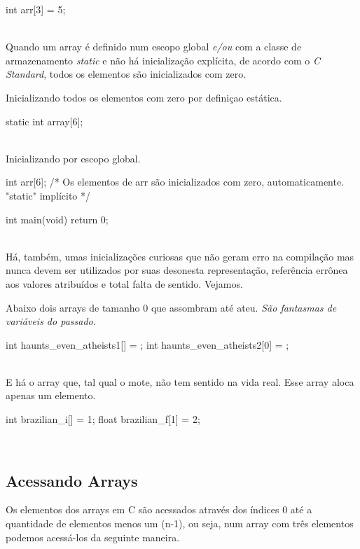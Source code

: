 \begin{ccode}
  int arr[3] = {5};
\end{ccode}
\\

Quando um array é definido num escopo global \textit{e/ou} com a classe de armazenamento \textit{static} e não há inicialização explícita, de acordo com o \textit{C Standard}, todos os elementos são inicializados com zero.

Inicializando todos os elementos com zero por definiçao estática.

\begin{ccode}
  static int array[6];
\end{ccode}
\\

Inicializando por escopo global.

\begin{ccode}
int arr[6];    /* Os elementos de arr são inicializados
                  com zero, automaticamente.
                  "static" implícito */

int main(void)
{
  return 0;
}
\end{ccode}
\\

Há, também, umas inicializações curiosas que não geram erro na compilação mas nunca devem ser utilizados por suas desonesta representação, referência errônea aos valores atribuídos e total falta de sentido. Vejamos.

Abaixo dois arrays  de tamanho 0 que assombram até ateu. \textit{São fantasmas de variáveis do passado.}

\begin{ccode}
  int haunts_even_atheists1[] = {};
  int haunts_even_atheists2[0] = {};
\end{ccode}
\\

E há o array  que, tal qual o mote, não tem sentido na vida real. Esse array aloca apenas um elemento.

\begin{ccode}
  int brazilian_i[] = {1};
  float brazilian_f[1] = {2};
\end{ccode}
\\

\subsection{Acessando Arrays}
Os elementos dos arrays em C são acessados através dos índices 0 até a quantidade de elementos menos um (n-1), ou seja, num array com três elementos podemos acessá-los da seguinte maneira.

